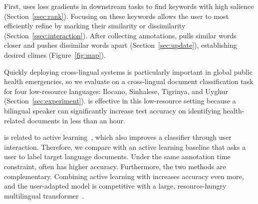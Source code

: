 First, \name{} uses loss gradients in downstream tasks to find keywords with high salience (Section~\ref{ssec:rank}).
Focusing on these keywords allows the user to most efficiently refine  by marking their similarity or dissimilarity (Section~\ref{ssec:interaction}).
After collecting annotations, \name{} pulls similar words closer and pushes dissimilar words apart
(Section~\ref{sec:update}), establishing desired climes (Figure~\ref{fig:map}).

Quickly deploying cross-lingual  systems is particularly important in
global public health emergencies, so we evaluate \name{} on a cross-lingual
document classification task for four low-resource languages: Ilocano,
Sinhalese, Tigrinya, and Uyghur (Section~\ref{sec:experiment}).
\name{} is effective in this low-resource setting because a bilingual speaker can significantly increase test accuracy on identifying health-related documents in
less than an hour.

\name{} is related to active learning~\citep{settles-09}, which also improves
a classifier through user interaction.
Therefore, we compare \name{} with an active learning baseline that asks a
user to label target language documents.
Under the same annotation time constraint, \name{} often has higher accuracy.
Furthermore, the two methods are complementary.
Combining active learning with \name{} increases accuracy even more,
and the user-adapted model is competitive with a large, resource-hungry multilingual transformer~\citep{conneau-20}.
